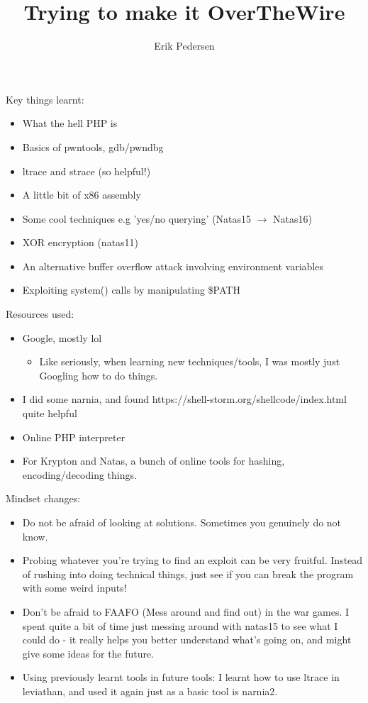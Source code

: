 \documentclass{article}
\title{Trying to make it OverTheWire}
\author{Erik Pedersen}
\begin{document}
Key things learnt:
\begin{itemize}
	\item What the hell PHP is
	\item Basics of pwntools, gdb/pwndbg
	\item ltrace and strace (so helpful!)
	\item A little bit of x86 assembly
	\item Some cool techniques e.g 'yes/no querying' (Natas15 $\to$ Natas16)
	\item XOR encryption (natas11)
	\item An alternative buffer overflow attack involving environment variables
	\item Exploiting system() calls by manipulating \$PATH
\end{itemize}
Resources used:

\begin{itemize}
	\item Google, mostly lol
		\begin{itemize}
			\item Like seriously, when learning new techniques/tools, I was mostly just Googling how to do things.
		\end{itemize}
	\item I did some narnia, and found https://shell-storm.org/shellcode/index.html quite helpful
	\item Online PHP interpreter
	\item For Krypton and Natas, a bunch of online tools for hashing, encoding/decoding things.

\end{itemize}

Mindset changes:

\begin{itemize}

	\item Do not be afraid of looking at solutions. Sometimes you genuinely do not know.
	\item Probing whatever you're trying to find an exploit can be very fruitful. Instead of rushing into doing technical things, just see if you can break the program with some weird inputs!
	\item Don't be afraid to FAAFO (Mess around and find out) in the war games. I spent quite a bit of time just messing around with natas15 to see what I could do - it really helps you better understand what's going on, and might give some ideas for the future.
	\item Using previously learnt tools in future tools: I learnt how to use ltrace in leviathan, and used it again just as a basic tool is narnia2.

\end{itemize}
\end{document}
